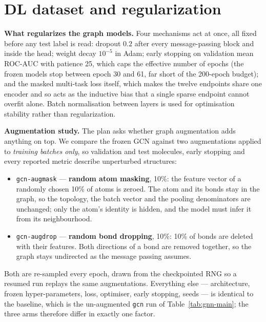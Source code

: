 \section{DL dataset and regularization}
\label{sec:regularization}

\textbf{What regularizes the graph models.} Four mechanisms act at once, all fixed before any
test label is read: dropout $0.2$ after every message-passing block and inside the head; weight
decay $10^{-5}$ in Adam; early stopping on validation mean ROC-AUC with patience 25, which caps
the effective number of epochs (the frozen models stop between epoch 30 and 61, far short of the
200-epoch budget); and the masked multi-task loss itself, which makes the twelve endpoints share
one encoder and so acts as the inductive bias that a single sparse endpoint cannot overfit alone.
Batch normalisation between layers is used for optimisation stability rather than regularization.

\textbf{Augmentation study.} The plan asks whether graph augmentation adds anything on top. We
compare the frozen GCN against two augmentations applied to \emph{training batches only}, so
validation and test molecules, early stopping and every reported metric describe unperturbed
structures:

\begin{itemize}
  \item \texttt{gcn-augmask} --- \textbf{random atom masking}, 10\%: the feature vector of a
        randomly chosen 10\% of atoms is zeroed. The atom and its bonds stay in the graph, so the
        topology, the batch vector and the pooling denominators are unchanged; only the atom's
        identity is hidden, and the model must infer it from its neighbourhood.
  \item \texttt{gcn-augdrop} --- \textbf{random bond dropping}, 10\%: 10\% of bonds are deleted
        with their features. Both directions of a bond are removed together, so the graph stays
        undirected as the message passing assumes.
\end{itemize}

Both are re-sampled every epoch, drawn from the checkpointed RNG so a resumed run replays the
same augmentations. Everything else --- architecture, frozen hyper-parameters, loss, optimiser,
early stopping, seeds --- is identical to the baseline, which is the un-augmented \texttt{gcn}
run of Table~\ref{tab:gnn-main}; the three arms therefore differ in exactly one factor.

